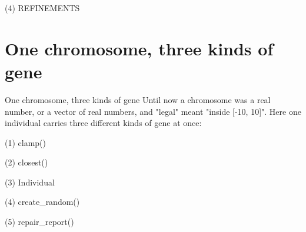 \begin{frame}[fragile]{(4) REFINEMENTS}

\end{frame}


\section{One chromosome, three kinds of gene}

\begin{frame}{One chromosome, three kinds of gene}
Until now a chromosome was a real number, or a vector of real numbers, and
"legal" meant "inside [-10, 10]". Here one individual carries three different
kinds of gene at once:
\end{frame}

\begin{frame}[fragile]{(1) clamp()}

\end{frame}

\begin{frame}[fragile]{(2) closest()}

\end{frame}

\begin{frame}[fragile]{(3) Individual}

\end{frame}

\begin{frame}[fragile]{(4) create\_random()}

\end{frame}

\begin{frame}[fragile]{(5) repair\_report()}

\end{frame}

